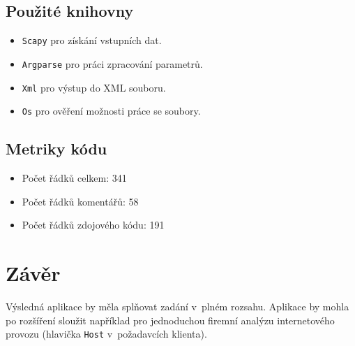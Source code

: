 \documentclass[a4paper, 11pt, titlepage]{article}
\begin{document}

	\subsection{Použité knihovny} %
	\label{sub:impl_knihovny}
	\begin{itemize}
		\item \texttt{Scapy} 	pro získání vstupních dat. 
		\item \texttt{Argparse} pro práci zpracování parametrů. 
		\item \texttt{Xml} 		pro výstup do XML souboru. 
		\item \texttt{Os} 		pro ověření možnosti práce se soubory. 
	\end{itemize}

	\subsection{Metriky kódu} %
	\label{sub:metriky_kodu}
	\begin{itemize}
		\item Počet řádků celkem: 341
		\item Počet řádků komentářů: 58
		\item Počet řádků zdojového kódu: 191
 	\end{itemize}


\section{Závěr} %
Výsledná aplikace by měla splňovat zadání v~plném rozsahu. Aplikace by mohla po rozšíření 
sloužit například pro jednoduchou firemní analýzu internetového provozu (hlavička \texttt{Host}
v~požadavcích klienta). 


\label{sec:zaver}


\newpage


\renewcommand{\refname}{Literatura}

\end{document}
